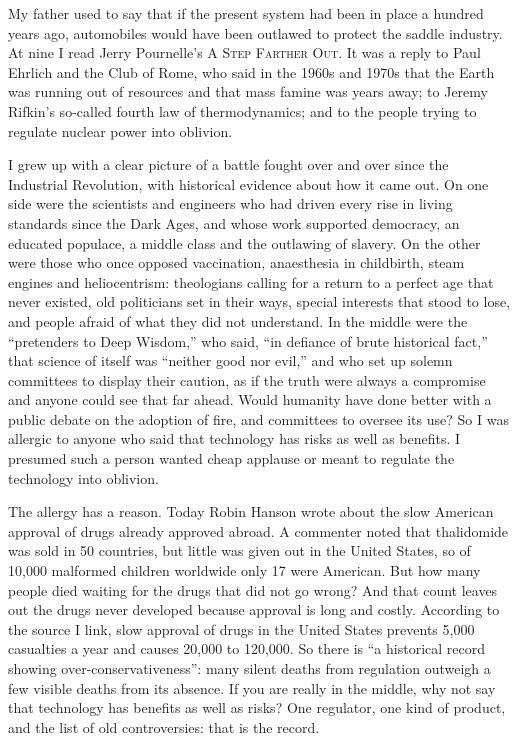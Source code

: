 
My father used to say that if the present system had been in place a hundred years ago, automobiles would have been outlawed to protect the saddle industry. At nine I read Jerry Pournelle's \textsc{A Step Farther Out}. It was a reply to Paul Ehrlich and the Club of Rome, who said in the 1960s and 1970s that the Earth was running out of resources and that mass famine was years away; to Jeremy Rifkin's so-called fourth law of thermodynamics; and to the people trying to regulate nuclear power into oblivion. 

I grew up with a clear picture of a battle fought over and over since the Industrial Revolution, with historical evidence about how it came out. On one side were the scientists and engineers who had driven every rise in living standards since the Dark Ages, and whose work supported democracy, an educated populace, a middle class and the outlawing of slavery. On the other were those who once opposed vaccination, anaesthesia in childbirth, steam engines and heliocentrism: theologians calling for a return to a perfect age that never existed, old politicians set in their ways, special interests that stood to lose, and people afraid of what they did not understand. In the middle were the ``pretenders to Deep Wisdom,'' who said, ``in defiance of brute historical fact,'' that science of itself was ``neither good nor evil,'' and who set up solemn committees to display their caution, as if the truth were always a compromise and anyone could see that far ahead. Would humanity have done better with a public debate on the adoption of fire, and committees to oversee its use?  So I was allergic to anyone who said that technology has risks as well as benefits. I presumed such a person wanted cheap applause or meant to regulate the technology into oblivion.

The allergy has a reason. Today Robin Hanson wrote about the slow American approval of drugs already approved abroad. A commenter noted that thalidomide was sold in 50 countries, but little was given out in the United States, so of 10,000 malformed children worldwide only 17 were American. But how many people died waiting for the drugs that did not go wrong? And that count leaves out the drugs never developed because approval is long and costly. According to the source I link, slow approval of drugs in the United States prevents 5,000 casualties a year and causes 20,000 to 120,000.  So there is ``a historical record showing over-conservativeness'': many silent deaths from regulation outweigh a few visible deaths from its absence. If you are really in the middle, why not say that technology has benefits as well as risks? One regulator, one kind of product, and the list of old controversies: that is the record.

